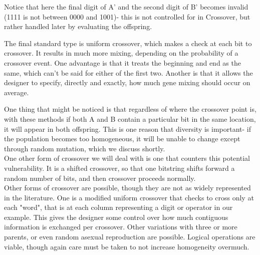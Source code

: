 Notice that here the final digit of A' and the second digit of B' becomes invalid (1111 is not between 0000 and 1001)- this is not controlled for in Crossover, but rather handled later by evaluating the offspring.

The final standard type is uniform crossover, which makes a check at each bit to crossover.  It results in much more mixing, depending on the probability of a crossover event.  One advantage is that it treats the beginning and end as the same, which can't be said for either of the first two.  Another is that it allows the designer to specify, directly and exactly, how much gene mixing should occur on average.

One thing that might be noticed is that regardless of where the crossover point is, with these methods if both A and B contain a particular bit in the same location, it will appear in both offspring.  This is one reason that diversity is important- if the population becomes too homogeneous, it will be unable to change except through random mutation, which we discuss shortly.\\
One other form of crossover we will deal with is one that counters this potential vulnerability.  It is a shifted crossover, so that one bitstring shifts forward a random number of bits, and then crossover proceeds normally.
\\
Other forms of crossover are possible, though they are not as widely represented in the literature.  One is a modified uniform crossover that checks to cross only  at each "word", that is at each column representing a digit or operator in our example.  This gives the designer some control over how much contiguous information is exchanged per crossover.  Other variations with three or more parents, or even random asexual reproduction are possible.  Logical operations are viable, though again care must be taken to not increase homogeneity overmuch. \\

